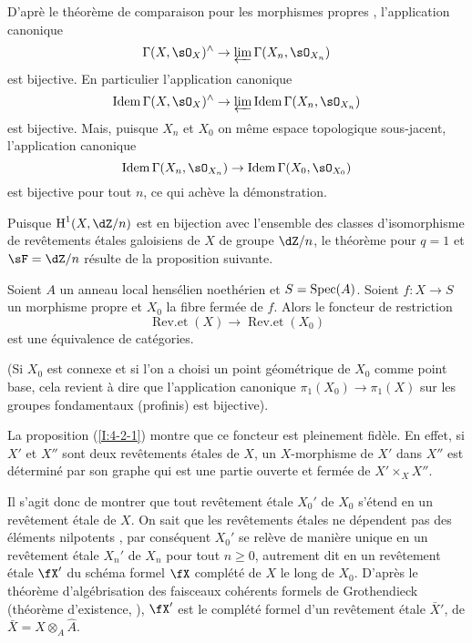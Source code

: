 D'aprè le théorème de comparaison pour les morphismes propres 
\cite[III.4.1]{ega}, l'application canonique
\[
  \Gamma(X, \sO_X)^\wedge \to \varprojlim \Gamma(X_n, \sO_{X_n})
\]
est bijective. En particulier l'application canonique 
\[
  \operatorname{Idem} \Gamma(X,\sO_X)^\wedge \to \varprojlim \operatorname{Idem}\Gamma(X_n,\sO_{X_n})
\]
est bijective. Mais, puisque $X_n$ et $X_0$ on même espace topologique 
sous-jacent, l'application canonique 
\[
  \operatorname{Idem}\Gamma(X_n,\sO_{X_n}) \to \operatorname{Idem} \Gamma(X_0,\sO_{X_0})
\]
est bijective pour tout $n$, ce qui achève la démonstration. 

Puisque $\h^1(X,\dZ/n)$ est en bijection avec l'ensemble des classes 
d'isomorphisme de revêtements étales galoisiens de $X$ de groupe $\dZ/n$, 
le théorème  pour $q=1$ et $\sF=\dZ/n$ résulte de la proposition suivante. 





\begin{proposition}\label{I:4-2-2}
Soient $A$ un anneau local hensélien noethérien et $S=\operatorname{Spec}(A)$. Soient 
$f:X\to S$ un morphisme propre et $X_0$ la fibre fermée de $f$. Alors le 
foncteur de restriction 
\[
  \operatorname{Rev.et}(X) \to \operatorname{Rev.et}(X_0)
\]
est une équivalence de catégories. 
\end{proposition}

(Si $X_0$ est connexe et si l'on a choisi un point géométrique de $X_0$ 
comme point base, cela revient à dire que l'application canonique 
$\pi_1(X_0)\to \pi_1(X)$ sur les groupes fondamentaux (profinis) est 
bijective). 

La proposition (\ref{I:4-2-1}) montre que ce foncteur est pleinement fidèle. En 
effet, si $X'$ et $X''$ sont deux revêtements étales de $X$, un 
$X$-morphisme de $X'$ dans $X''$ est déterminé par son graphe qui est une 
partie ouverte et fermée de $X'\times_X X''$. 

Il s'agit donc de montrer que tout revêtement étale $X_0'$ de $X_0$ s'étend 
en un revêtement étale de $X$. On sait que les revêtements étales ne 
dépendent pas des éléments nilpotents \cite[ch.1]{sga1}, par conséquent 
$X_0'$ se relève de manière unique en un revêtement étale $X_n'$ de 
$X_n$ pour tout $n\geqslant 0$, autrement dit en un revêtement étale 
$\fX'$ du schéma formel $\fX$ complété de $X$ le long de $X_0$. D'après 
le théorème d'algébrisation des faisceaux cohérents formels de 
Grothendieck (théorème d'existence, \cite[III.5]{ega}), $\fX'$ est le 
complété formel d'un revêtement étale $\bar X'$, de 
$\bar X=X\otimes_A \hat A$. 

